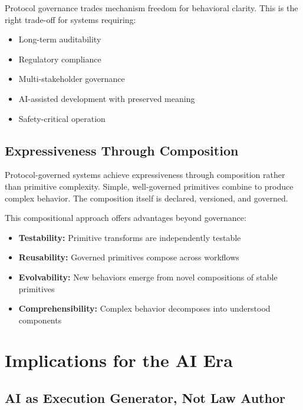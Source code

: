 \documentclass[11pt,a4paper]{article}
\begin{document}
Protocol governance trades mechanism freedom for behavioral clarity. This is the right trade-off for systems requiring:

\begin{itemize}[nosep]
    \item Long-term auditability
    \item Regulatory compliance
    \item Multi-stakeholder governance
    \item AI-assisted development with preserved meaning
    \item Safety-critical operation
\end{itemize}

\subsection{Expressiveness Through Composition}

Protocol-governed systems achieve expressiveness through composition rather than primitive complexity. Simple, well-governed primitives combine to produce complex behavior. The composition itself is declared, versioned, and governed.

This compositional approach offers advantages beyond governance:

\begin{itemize}[nosep]
    \item \textbf{Testability:} Primitive transforms are independently testable
    \item \textbf{Reusability:} Governed primitives compose across workflows
    \item \textbf{Evolvability:} New behaviors emerge from novel compositions of stable primitives
    \item \textbf{Comprehensibility:} Complex behavior decomposes into understood components
\end{itemize}



\section{Implications for the AI Era}
\label{sec:ai-era}

\subsection{AI as Execution Generator, Not Law Author}
\end{document}
